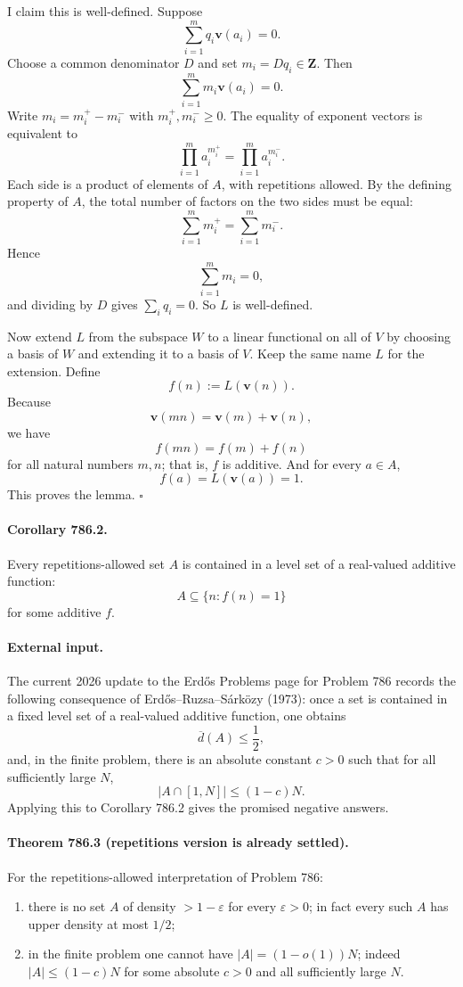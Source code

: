 I claim this is well-defined. Suppose
\[
 \sum_{i=1}^m q_i \mathbf v(a_i)=0.
\]
Choose a common denominator $D$ and set $m_i = D q_i \in \mathbf Z$. Then
\[
 \sum_{i=1}^m m_i \mathbf v(a_i)=0.
\]
Write $m_i = m_i^+ - m_i^-$ with $m_i^+,m_i^- \ge 0$. The equality of exponent vectors is equivalent to
\[
 \prod_{i=1}^m a_i^{m_i^+} = \prod_{i=1}^m a_i^{m_i^-}.
\]
Each side is a product of elements of $A$, with repetitions allowed. By the defining property of $A$, the total number of factors on the two sides must be equal:
\[
 \sum_{i=1}^m m_i^+ = \sum_{i=1}^m m_i^-.
\]
Hence
\[
 \sum_{i=1}^m m_i = 0,
\]
and dividing by $D$ gives $\sum_i q_i = 0$. So $L$ is well-defined.

Now extend $L$ from the subspace $W$ to a linear functional on all of $V$ by choosing a basis of $W$ and extending it to a basis of $V$. Keep the same name $L$ for the extension. Define
\[
 f(n) := L(\mathbf v(n)).
\]
Because
\[
 \mathbf v(mn)=\mathbf v(m)+\mathbf v(n),
\]
we have
\[
 f(mn)=f(m)+f(n)
\]
for all natural numbers $m,n$; that is, $f$ is additive. And for every $a \in A$,
\[
 f(a)=L(\mathbf v(a))=1.
\]
This proves the lemma.
\hfill$\square$

\paragraph{Corollary 786.2.}
Every repetitions-allowed set $A$ is contained in a level set of a real-valued additive function:
\[
 A \subseteq \{n : f(n)=1\}
\]
for some additive $f$.

\paragraph{External input.}
The current 2026 update to the Erd\H{o}s Problems page for Problem 786 records the following consequence of Erd\H{o}s--Ruzsa--S\'ark\"ozy (1973): once a set is contained in a fixed level set of a real-valued additive function, one obtains
\[
 \overline d(A) \le \frac12,
\]
and, in the finite problem, there is an absolute constant $c>0$ such that for all sufficiently large $N$,
\[
 |A \cap [1,N]| \le (1-c)N.
\]
Applying this to Corollary 786.2 gives the promised negative answers.

\paragraph{Theorem 786.3 (repetitions version is already settled).}
For the repetitions-allowed interpretation of Problem 786:
\begin{enumerate}
\item there is no set $A$ of density $>1-\varepsilon$ for every $\varepsilon>0$; in fact every such $A$ has upper density at most $1/2$;
\item in the finite problem one cannot have $|A|=(1-o(1))N$; indeed $|A| \le (1-c)N$ for some absolute $c>0$ and all sufficiently large $N$.
\end{enumerate}

